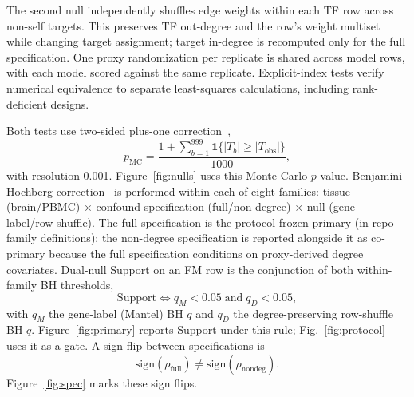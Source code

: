 \documentclass[fleqn,10pt,lineno]{wlpeerj}
\begin{document}
The second null independently shuffles edge weights within each TF row across non-self targets. This
preserves TF out-degree and the row's weight multiset while changing target assignment; target
in-degree is recomputed only for the full specification. One proxy randomization per replicate is
shared across model rows, with each model scored against the same replicate. Explicit-index tests
verify numerical equivalence to separate least-squares calculations, including rank-deficient designs.

Both tests use two-sided plus-one correction~\citep{phipson2010permutation},
\begin{equation}
\label{eq:plus-one}
 p_{\mathrm{MC}}=\frac{1+\sum_{b=1}^{999}\mathbf{1}\{|T_b|\ge |T_{\mathrm{obs}}|\}}{1000},
\end{equation}
with resolution 0.001. Figure~\ref{fig:nulls} uses this Monte Carlo $p$-value.
Benjamini--Hochberg correction~\citep{benjamini1995fdr} is performed within
each of eight families: tissue (brain/PBMC) $\times$ confound specification (full/non-degree)
$\times$ null (gene-label/row-shuffle). The full specification is the protocol-frozen primary (in-repo
family definitions); the non-degree specification is reported alongside it as co-primary because the
full specification conditions on proxy-derived degree covariates.
Dual-null Support on an FM row is the conjunction of both within-family BH thresholds,
\begin{equation}
\label{eq:dual-null}
\mathrm{Support}
\iff
q_M<0.05
\;\text{and}\;
q_D<0.05,
\end{equation}
with $q_M$ the gene-label (Mantel) BH $q$ and $q_D$ the degree-preserving row-shuffle BH $q$.
Figure~\ref{fig:primary} reports Support under this rule; Fig.~\ref{fig:protocol} uses it as a gate.
A sign flip between specifications is
\begin{equation}
\label{eq:sign-flip}
\mathrm{sign}(\rho_{\mathrm{full}})
\neq
\mathrm{sign}(\rho_{\mathrm{nondeg}}).
\end{equation}
Figure~\ref{fig:spec} marks these sign flips.
\end{document}
